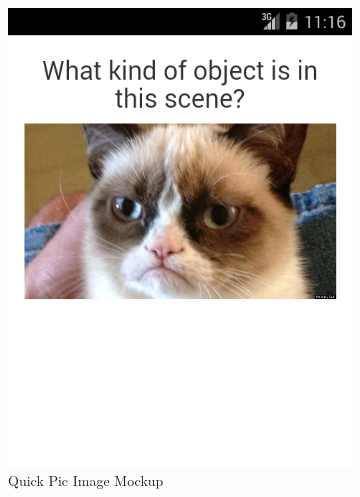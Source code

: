 \documentclass{article}
\begin{document}
\begin{figure}
  \centering
  \begin{subfigure}[b]{0.49\textwidth}
    \includegraphics[width=\textwidth]{ss_quickpic_image}
    \caption{Quick Pic Image Mockup}
  \end{subfigure}
  \begin{subfigure}[b]{0.49\textwidth}

\end{subfigure}
\end{figure}
\end{document}
